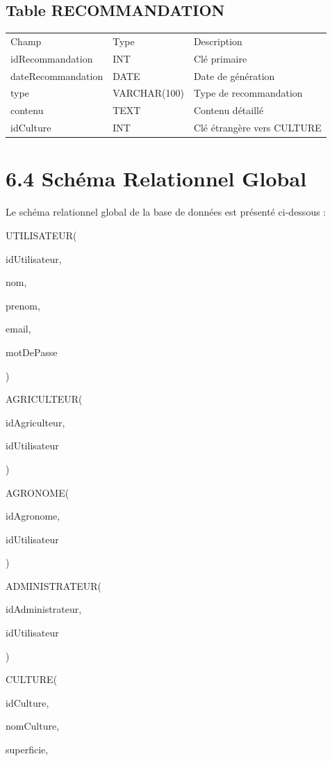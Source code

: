 \documentclass[
]{article}
\begin{document}
\hypertarget{table-recommandation}{%
\subsection{Table RECOMMANDATION}\label{table-recommandation}}

\begin{longtable}[]{@{}lll@{}}
\toprule
\endhead
Champ & Type & Description \\
idRecommandation & INT & Clé primaire \\
dateRecommandation & DATE & Date de génération \\
type & VARCHAR(100) & Type de recommandation \\
contenu & TEXT & Contenu détaillé \\
idCulture & INT & Clé étrangère vers CULTURE \\
\bottomrule
\end{longtable}

\hypertarget{schuxe9ma-relationnel-global}{%
\section{6.4 Schéma Relationnel
Global}\label{schuxe9ma-relationnel-global}}

Le schéma relationnel global de la base de données est présenté
ci-dessous :

UTILISATEUR(

idUtilisateur,

nom,

prenom,

email,

motDePasse

)

AGRICULTEUR(

idAgriculteur,

idUtilisateur

)

AGRONOME(

idAgronome,

idUtilisateur

)

ADMINISTRATEUR(

idAdministrateur,

idUtilisateur

)

CULTURE(

idCulture,

nomCulture,

superficie,
\end{document}
